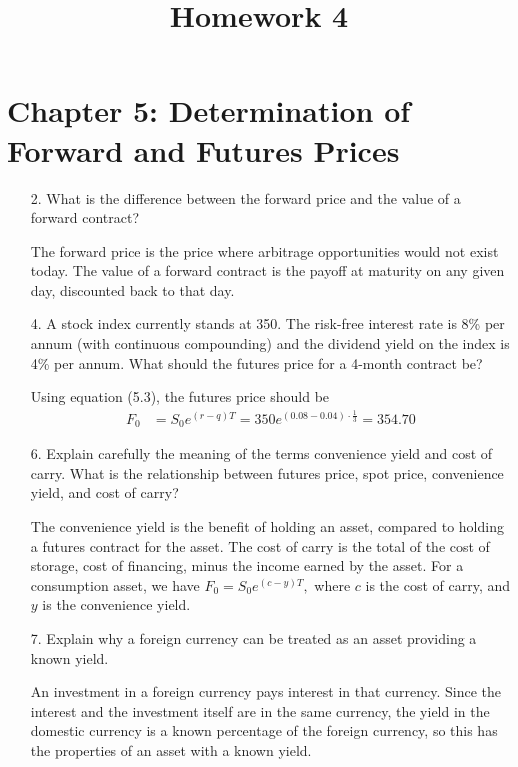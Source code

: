 \documentclass{article}
\begin{document}
\title{Homework 4}
\maketitle
\thispagestyle{fancy}

\section*{Chapter 5: Determination of Forward and Futures Prices}

\begin{itemize}
	\item[2.] What is the difference between the forward price and the value of a forward contract?
		\begin{answer*}
			The forward price is the price where arbitrage opportunities would not exist today. The value of a forward contract is the payoff at maturity on any given day, discounted back to that day. 
		\end{answer*}

	\item[4.] A stock index currently stands at 350. The risk-free interest rate is 8\% per annum (with continuous compounding) and the dividend yield on the index is 4\% per annum. What should the futures price for a 4-month contract be?
		\begin{soln}
			Using equation (5.3), the futures price should be
			\begin{align*}
				F_0 &= S_0 e^{(r-q)T} = 350e^{(0.08-0.04)\cdot \frac{1}{3}} = 354.70
			\end{align*}
		\end{soln}

	\item[6.] Explain carefully the meaning of the terms convenience yield and cost of carry. What is the relationship between futures price, spot price, convenience yield, and cost of carry?
		\begin{answer*}
			The convenience yield is the benefit of holding an asset, compared to holding a futures contract for the asset. The cost of carry is the total of the cost of storage, cost of financing, minus the income earned by the asset. For a consumption asset, we have $F_0 = S_0e^{(c-y)T},$ where $c$ is the cost of carry, and $y$ is the convenience yield.
		\end{answer*}

	\item[7.] Explain why a foreign currency can be treated as an asset providing a known yield.
		\begin{answer*}
			An investment in a foreign currency pays interest in that currency. Since the interest and the investment itself are in the same currency, the yield in the domestic currency is a known percentage of the foreign currency, so this has the properties of an asset with a known yield.
		\end{answer*}


\end{itemize}
\end{document}
